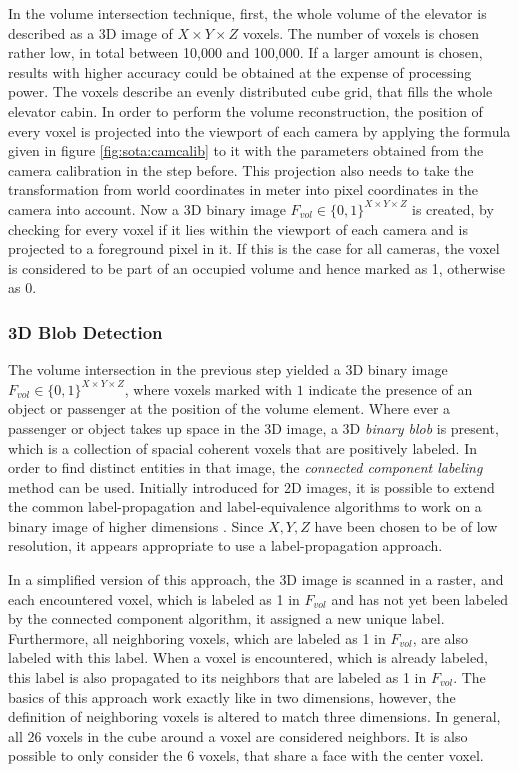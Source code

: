 In the volume intersection technique, first, the whole volume of the elevator is described as a \ac{3D} image of $ X \times Y \times Z $ voxels.
The number of voxels is chosen rather low, in total between 10,000 and 100,000.
If a larger amount is chosen, results with higher accuracy could be obtained at the expense of processing power.
The voxels describe an evenly distributed cube grid, that fills the whole elevator cabin.
In order to perform the volume reconstruction,
the position of every voxel is projected into the viewport of each camera by applying the formula given in figure \ref{fig:sota:camcalib} to it with the parameters obtained from the camera calibration in the step before. 
This projection also needs to take the transformation from world coordinates in meter into pixel coordinates in the camera into account.
Now a \ac{3D} binary image $ F_{vol} \in \{0, 1\}^{X \times Y \times Z} $ is created, by checking for every voxel if it lies within the viewport of each camera and is projected to a foreground pixel in it.
If this is the case for all cameras, the voxel is considered to be part of an occupied volume and hence marked as 1, otherwise as 0.

\subsubsection{3D Blob Detection}

The volume intersection in the previous step yielded a \ac{3D} binary image \\
$ F_{vol} \in \{0, 1\}^{X \times Y \times Z} $, where voxels marked with $ 1 $ indicate the presence of an object or passenger at the position of the volume element.
Where ever a passenger or object takes up space in the \ac{3D} image, a \ac{3D} \emph{binary blob} is present, which is a collection of spacial coherent voxels that are positively labeled.
In order to find distinct entities in that image, the \emph{connected component labeling} method can be used.
Initially introduced for \ac{2D} images, it is possible to extend 
the common label-propagation and label-equivalence algorithms to work on a binary image of higher dimensions
\autocite[][p.~39]{he2017connected}.
Since $ X, Y, Z $ have been chosen to be of low resolution, it appears appropriate to use a label-propagation approach.

In a simplified version of this approach, the \ac{3D} image is scanned in a raster, 
and each encountered voxel, which is labeled as 1 in $ F_{vol} $ and has not yet been labeled by the connected component algorithm, it assigned a new unique label.
Furthermore, all neighboring voxels, which are labeled as 1 in $ F_{vol} $, are also labeled with this label.
When a voxel is encountered, which is already labeled, this label is also propagated to its neighbors that are labeled as 1 in $ F_{vol} $. 
The basics of this approach work exactly like in two dimensions, however, the definition of neighboring voxels is altered to match three dimensions. 
In general, all 26 voxels in the cube around a voxel are considered neighbors.
It is also possible to only consider the 6 voxels, that share a face with the center voxel.

